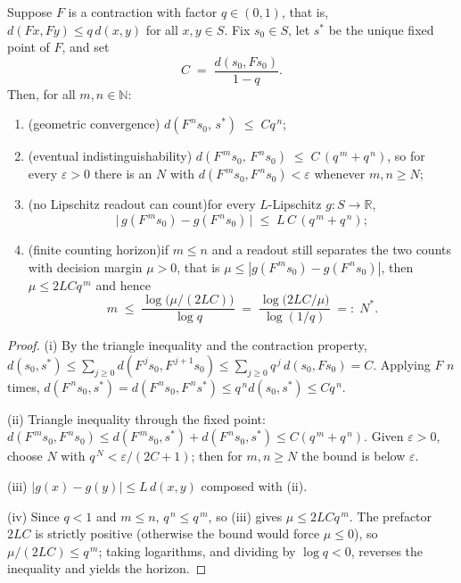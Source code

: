 \begin{theorem}
\label{thm:collapse}
Suppose $F$ is a contraction with factor $q \in (0,1)$, that is,
$d(Fx, Fy) \le q\, d(x,y)$ for all $x, y \in S$. Fix $s_0 \in S$, let
$s^\ast$ be the unique fixed point of $F$, and set
\[
  C \;=\; \frac{d(s_0, F s_0)}{1 - q}.
\]
Then, for all $m, n \in \mathbb{N}$:
\begin{enumerate}
\item[(i)] \textup{(geometric convergence)}\quad
      $d(F^{\,n} s_0,\, s^\ast) \;\le\; C q^{\,n}$;
\item[(ii)] \textup{(eventual indistinguishability)}\quad
      $d(F^{\,m} s_0,\, F^{\,n} s_0) \;\le\; C\,(q^{\,m} + q^{\,n})$, so
      for every $\varepsilon > 0$ there is an $N$ with
      $d(F^{\,m} s_0, F^{\,n} s_0) < \varepsilon$ whenever $m, n \ge N$;
\item[(iii)] \textup{(no Lipschitz readout can count)}\quad for every
      $L$-Lipschitz $g \colon S \to \mathbb{R}$,
      \[
        \bigl|\, g(F^{\,m} s_0) - g(F^{\,n} s_0) \,\bigr|
        \;\le\; L\, C\, (q^{\,m} + q^{\,n});
      \]
\item[(iv)] \textup{(finite counting horizon)}\quad if $m \le n$ and a
      readout still separates the two counts with decision margin
      $\mu > 0$, that is
      $\mu \le |g(F^{\,m} s_0) - g(F^{\,n} s_0)|$, then
      $\mu \le 2 L C q^{\,m}$ and hence
      \[
        m \;\le\; \frac{\log\bigl(\mu / (2 L C)\bigr)}{\log q}
          \;=\; \frac{\log\bigl(2 L C / \mu\bigr)}{\log (1/q)}
          \;=:\; N^\ast .
      \]
\end{enumerate}
\end{theorem}

\begin{proof}
(i) By the triangle inequality and the contraction property,
$d(s_0, s^\ast) \le \sum_{j \ge 0} d(F^{\,j} s_0, F^{\,j+1} s_0)
\le \sum_{j \ge 0} q^{\,j}\, d(s_0, F s_0) = C$. Applying $F$ $n$ times,
$d(F^{\,n} s_0, s^\ast) = d(F^{\,n} s_0, F^{\,n} s^\ast)
\le q^{\,n} d(s_0, s^\ast) \le C q^{\,n}$.

(ii) Triangle inequality through the fixed point:
$d(F^{\,m} s_0, F^{\,n} s_0) \le d(F^{\,m} s_0, s^\ast) +
d(F^{\,n} s_0, s^\ast) \le C(q^{\,m} + q^{\,n})$. Given
$\varepsilon > 0$, choose $N$ with
$q^{\,N} < \varepsilon / (2C + 1)$; then for $m, n \ge N$ the bound is
below $\varepsilon$.

(iii) $|g(x) - g(y)| \le L\, d(x,y)$ composed with (ii).

(iv) Since $q < 1$ and $m \le n$, $q^{\,n} \le q^{\,m}$, so (iii) gives
$\mu \le 2 L C q^{\,m}$. The prefactor $2LC$ is strictly positive
(otherwise the bound would force $\mu \le 0$), so
$\mu / (2LC) \le q^{\,m}$; taking logarithms, and dividing by
$\log q < 0$, reverses the inequality and yields the horizon.
\end{proof}

